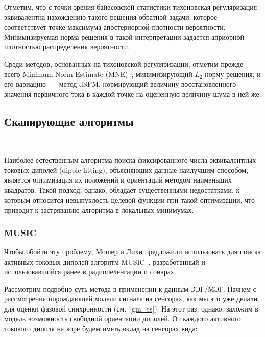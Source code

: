 Отметим, что с точки зрения байесовской статистики тихоновская регуляризация
эквивалентна нахождению такого решения обратной задачи, которое соответствует
точке максимума апостериорной плотности вероятности. Минимизируемая норма решения в такой
интерпретации задается априорной плотностью распределения вероятности.

Среди методов, основанных на тихоновской регуляризации, отметим прежде всего
Minimum Norm Estimate (MNE)~\cite{Hamalainen1994}, минимизирующий $L_2$-норму решения,
и его вариацию~--- метод dSPM, нормирующий величину восстановленного значения первичного
тока в каждой точке на оцененную величину шума в ней же.

\subsection{Сканирующие алгоритмы}~\label{sec:scan_algorithms}

Наиболее естественным алгоритма поиска фиксированного числа эквивалентных
токовых диполей (dipole fitting), объясняющих данные наилучшим способом,
является оптимизация их положений и ориентаций методом наименьших квадратов.
Такой подход, однако, обладает существенными недостатками, к которым относится
невыпуклость целевой функции при такой оптимизации,
что приводит к застряванию алгоритма в локальных минимумах.

\subsubsection{MUSIC}
Чтобы обойти эту проблему, Мошер и Лихи предложили использовать для
поиска активных токовых диполей алгоритм MUSIC~\cite{Mosher1992, Schmidt1986}, разработанный
и использовавшийся ранее в радиопеленгации и сонарах.

Рассмотрим подробно суть метода в применении к данным ЭЭГ/МЭГ.
Начнем с рассмотрения порождающей модели сигнала на сенсорах, как мы это
уже делали для оценки фазовой синхронности (см.~\ref{gm_ts}).
На этот раз, однако, заложим в модель возможность свободной ориентации диполей.
От каждого активного токового диполя на коре будем иметь вклад на сенсорах вида:

